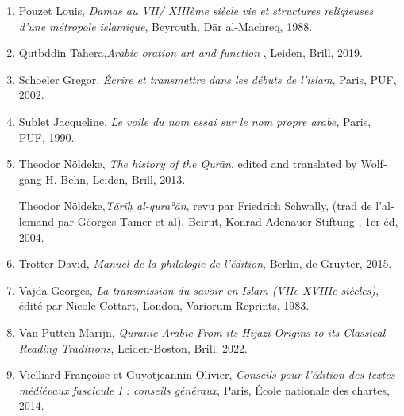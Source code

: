 \documentclass[a4paper,12pt]{report}
\begin{document}
\begin{french}
\begin{enumerate} [III]
\begin{enumerate}
 



\item Pouzet Louis, \textit{Damas au VII/ XIIIème siècle vie et structures religieuses d'une métropole islamique}, Beyrouth, D\=ar al-Machreq, 1988.

\item Qutbddin Tahera,\textit{Arabic oration art and function }, Leiden, Brill, 2019. 

  \item \normalsize   Schoeler Gregor, \textit{Écrire et transmettre dans les débuts de l'islam}, Paris, PUF, 2002.
  \item Sublet Jacqueline, \textit{Le voile du nom essai sur le nom propre arabe,} Paris, PUF, 1990.
  \item 	Theodor Nöldeke, \textit{The history of the Qurān}, edited and translated by Wolfgang H. Behn, Leiden, Brill, 2013.

\textemdash\textemdash Theodor Nöldeke,\textit {Tārīḫ al-quraʾān}, revu par Friedrich Schwally, (trad de l’allemand par Géorges Tāmer et al), Beirut, Konrad-Adenauer-Stiftung , 1er éd, 2004.
\item	Trotter David, \textit{Manuel de la philologie de l’édition}, Berlin, de Gruyter,  2015. 
  

\item  Vajda Georges, \textit{La transmission du savoir en Islam (VIIe-XVIIIe siècles)}, édité par Nicole Cottart, London, Variorum Reprints, 1983.
\item Van Putten  Marijn, \textit{Quranic Arabic
From its Hijazi Origins to its Classical Reading Traditions}, Leiden-Boston, Brill, 2022.

\item Vielliard Françoise et Guyotjeannin Olivier, \textit{Conseils pour l’édition des textes médiévaux fascicule I : conseils généraux}, Paris, École nationale des chartes, 2014.


        
        
    \end{enumerate}
\end{enumerate}

























\end{french}
\end{document}
